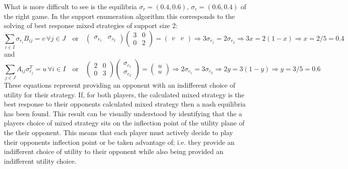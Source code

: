 \documentclass[9pt]{report}
\begin{document}
    What is more difficult to see is the equilibria $\sigma_r=(0.4,0.6),\, \sigma_c=(0.6,0.4)$ of the right game. In the support enumeration algorithm this corresponds to the solving of best response mixed strategies of support size 2:
    \begingroup\makeatletter\def\f@size{8}\check@mathfonts
     $$ 
        \sum_{i\in I} \sigma_{r_i} B_{ij} = v \, \forall j \in J \quad \text{or} \quad
        \begin{pmatrix} \sigma_{r_1} & \sigma_{r_2} \end{pmatrix}
        \begin{pmatrix} 3 & 0 \\ 0 & 2 \end{pmatrix}
        = 
        \begin{pmatrix} v & v \end{pmatrix}
        \Rightarrow
        3 \sigma_{r_1} = 2 \sigma_{r_2}
        \Rightarrow
        3 x = 2(1-x) 
        \Rightarrow
        x=2/5 = 0.4
        $$
    and 
    $$ 
        \sum_{j\in J} A _{ij} \sigma_{c_j}^T = u \, \forall i \in I \quad \text{or} \quad
        \begin{pmatrix} 2 & 0 \\ 0 & 3 \end{pmatrix}
        \begin{pmatrix} \sigma_{c_1} \\ \sigma_{c_2} \end{pmatrix}
        = 
        \begin{pmatrix} u \\ u \end{pmatrix}
        \Rightarrow
        2 \sigma_{c_1} = 3 \sigma_{c_2}  
        \Rightarrow
        2 y = 3(1-y) 
        \Rightarrow
        y=3/5 = 0.6$$
    \endgroup
    These equations represent providing an opponent with an indifferent choice of utility for their strategy. If, for both players, the calculated mixed strategy is the best response to their opponents calculated mixed strategy then a nash equilibria has been found. This result can be visually understood by identifying that the a players choice of mixed strategy sits on the inflection point of the utility plane of the their opponent. This means that each player must actively decide to play their opponents inflection point or be taken advantage of; i.e. they provide an indifferent choice of utility to their opponent while also being provided an indifferent  utility choice.
\end{document}
